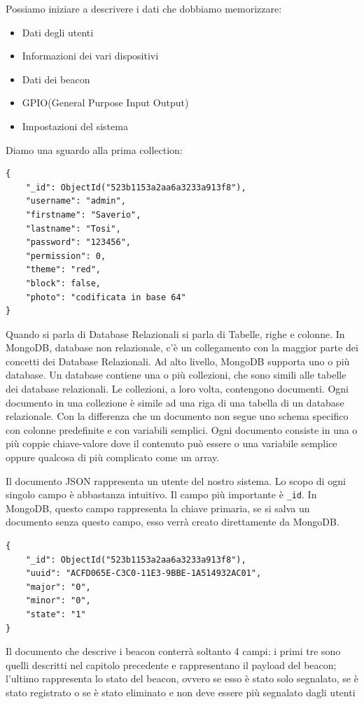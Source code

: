 Possiamo iniziare a descrivere i dati che dobbiamo memorizzare:
\begin{itemize}
\item Dati degli utenti
\item Informazioni dei vari dispositivi
\item Dati dei beacon
\item GPIO(General Purpose Input Output)
\item Impostazioni del sistema
\end{itemize}
Diamo una sguardo alla prima collection:
\begin{lstlisting}[caption={User collection}, style=javaScriptCode]
{
    "_id": ObjectId("523b1153a2aa6a3233a913f8"),
    "username": "admin",
    "firstname": "Saverio",
    "lastname": "Tosi",
    "password": "123456",
    "permission": 0,
    "theme": "red",
    "block": false,
    "photo": "codificata in base 64"
}
\end{lstlisting}
Quando si parla di Database Relazionali si parla di Tabelle, righe e colonne.
In MongoDB, database non relazionale, c'è un collegamento con la maggior parte dei concetti dei Database Relazionali. Ad alto livello, MongoDB supporta uno o più database. 
Un database contiene una o più collezioni, che sono simili alle tabelle dei database relazionali. Le collezioni, a loro volta, contengono documenti. 
Ogni documento in una collezione è simile ad una riga di una tabella di un database relazionale. Con la differenza che un documento non segue uno schema specifico con colonne predefinite e con variabili semplici. 
Ogni documento consiste in una o più coppie chiave-valore dove il contenuto può essere o una variabile semplice oppure qualcosa di più complicato come un array.

Il documento JSON rappresenta un utente del nostro sistema. Lo scopo di ogni singolo campo è abbastanza intuitivo. Il campo più importante è \texttt{\_id}. 
In MongoDB, questo campo rappresenta la chiave primaria, se si salva un documento senza questo campo, esso verrà creato direttamente da MongoDB.

\begin{lstlisting}[caption={Beacon collection}, style=javaScriptCode]
{
    "_id": ObjectId("523b1153a2aa6a3233a913f8"),
    "uuid": "ACFD065E-C3C0-11E3-9BBE-1A514932AC01",
    "major": "0",
    "minor": "0",
    "state": "1"
}
\end{lstlisting}

Il documento che descrive i beacon conterrà soltanto 4 campi:
i primi tre sono quelli descritti nel capitolo precedente e rappresentano il payload del beacon; l'ultimo rappresenta lo stato del beacon, ovvero se esso è stato solo segnalato, se è stato registrato o se è stato eliminato e non deve essere più segnalato dagli utenti

